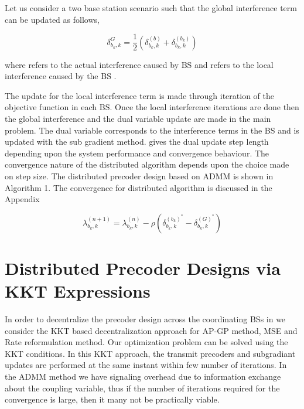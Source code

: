 Let us consider a two base station scenario such that the global interference term can be updated as follows,

\begin{equation}
\delta ^ {G}_{b_k,k} ={ \frac {1} {2}}{(\delta^{(b)}_{b_k,k}+\delta^{(b_k)}_{b_k,k})}
\label{deltaupdate_eqn}
\end{equation}

where  refers to the actual interference caused by BS  and  refers to the local interference caused by the BS .

The update for the local interference term is made through iteration of the objective function in each BS. Once the local interference iterations are done then the global interference and the dual variable update are made in the main problem. The dual variable corresponds to the interference terms in the BS  and is updated with the sub gradient method. \me{\rho} gives the dual update step length depending upon the system performance and convergence behaviour. The convergence nature  of the distributed algorithm depends upon the choice made on step size. The distributed precoder design based on \ac{ADMM} is shown in Algorithm 1. The convergence for distributed algorithm is discussed in the Appendix

\begin{equation}
\lambda ^ {(n+1)}_{b_k,k} = \lambda ^ {(n)}_{b_k,k} - \rho{(\delta^{(b_k)^*}_{b_k,k}-\delta^{(G)^*}_{b_k,k})}
\label{update_eqn}
\end{equation}

\section{Distributed Precoder Designs via KKT Expressions}

In order to decentralize the precoder design across the coordinating \ac{BS}s in  we consider the \ac{KKT} based decentralization approach for \ac{AP-GP} method, \ac{MSE} and Rate reformulation method. Our optimization problem can be solved using the \ac{KKT} conditions. In this \ac{KKT} approach, the transmit precoders and subgradiant updates are performed at the same instant within few number of iterations. In the \ac{ADMM} method we have signaling overhead due to information exchange about the coupling variable, thus if the number of iterations required for the convergence is large, then it many not be practically viable.

